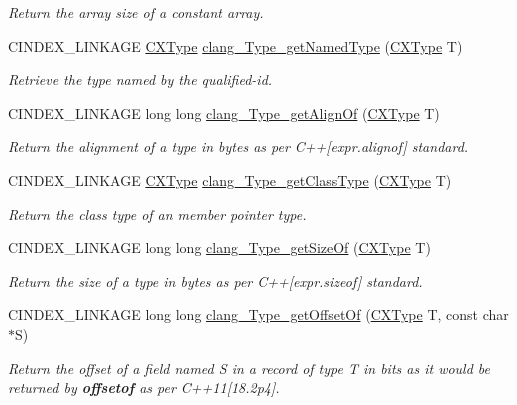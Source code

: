 \begin{DoxyCompactItemize}
\begin{DoxyCompactList}\small\item\em Return the array size of a constant array. \end{DoxyCompactList}\item 
C\+I\+N\+D\+E\+X\+\_\+\+L\+I\+N\+K\+A\+GE \hyperlink{structCXType}{C\+X\+Type} \hyperlink{group__CINDEX__TYPES_gac6d90c2acdae77f75d8e8288658da463}{clang\+\_\+\+Type\+\_\+get\+Named\+Type} (\hyperlink{structCXType}{C\+X\+Type} T)
\begin{DoxyCompactList}\small\item\em Retrieve the type named by the qualified-\/id. \end{DoxyCompactList}\item 
C\+I\+N\+D\+E\+X\+\_\+\+L\+I\+N\+K\+A\+GE long long \hyperlink{group__CINDEX__TYPES_gaee56de66c69ab5605fe47e7c52497e31}{clang\+\_\+\+Type\+\_\+get\+Align\+Of} (\hyperlink{structCXType}{C\+X\+Type} T)
\begin{DoxyCompactList}\small\item\em Return the alignment of a type in bytes as per C++\mbox{[}expr.\+alignof\mbox{]} standard. \end{DoxyCompactList}\item 
C\+I\+N\+D\+E\+X\+\_\+\+L\+I\+N\+K\+A\+GE \hyperlink{structCXType}{C\+X\+Type} \hyperlink{group__CINDEX__TYPES_ga4434129ffc0fb0fc668a593e226d62cc}{clang\+\_\+\+Type\+\_\+get\+Class\+Type} (\hyperlink{structCXType}{C\+X\+Type} T)
\begin{DoxyCompactList}\small\item\em Return the class type of an member pointer type. \end{DoxyCompactList}\item 
C\+I\+N\+D\+E\+X\+\_\+\+L\+I\+N\+K\+A\+GE long long \hyperlink{group__CINDEX__TYPES_ga027abe334546e80931905f31399d0a8b}{clang\+\_\+\+Type\+\_\+get\+Size\+Of} (\hyperlink{structCXType}{C\+X\+Type} T)
\begin{DoxyCompactList}\small\item\em Return the size of a type in bytes as per C++\mbox{[}expr.\+sizeof\mbox{]} standard. \end{DoxyCompactList}\item 
C\+I\+N\+D\+E\+X\+\_\+\+L\+I\+N\+K\+A\+GE long long \hyperlink{group__CINDEX__TYPES_gab543536d5c18efb3e23a1b7903fb494d}{clang\+\_\+\+Type\+\_\+get\+Offset\+Of} (\hyperlink{structCXType}{C\+X\+Type} T, const char $\ast$S)
\begin{DoxyCompactList}\small\item\em Return the offset of a field named S in a record of type T in bits as it would be returned by {\bfseries offsetof} as per C++11\mbox{[}18.\+2p4\mbox{]}. \end{DoxyCompactList}\item 

\end{DoxyCompactItemize}
